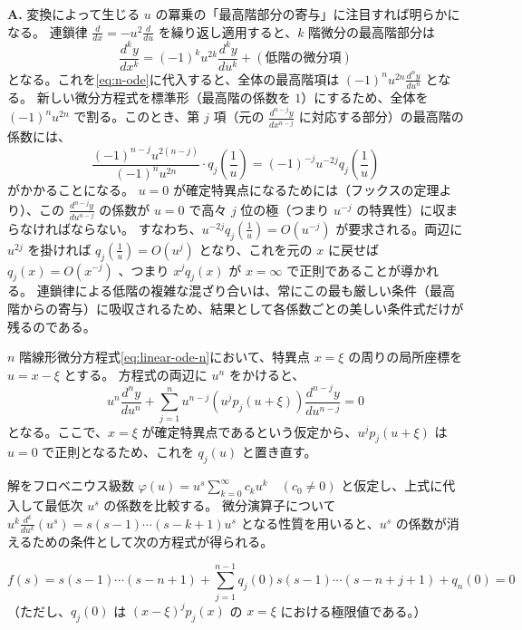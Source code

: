 \begin{Q}[【核心】$x=\frac{1}{u}$ と変換したとき、連鎖律によって微分方程式は低階の項が複雑に混ざり合った形になるはずである。それにもかかわらず、なぜ $x^{j}q_{j}(x)$ が正則という、各項が独立したシンプルな条件に帰着するのか？]
\textbf{A.} 変換によって生じる $u$ の冪乗の「最高階部分の寄与」に注目すれば明らかになる。
連鎖律 $\frac{d}{dx} = -u^{2}\frac{d}{du}$ を繰り返し適用すると、$k$ 階微分の最高階部分は
\[
\frac{d^{k}y}{dx^{k}} = (-1)^{k} u^{2k} \frac{d^{k}y}{du^{k}} + (\text{低階の微分項})
\]
となる。これを\eqref{eq:n-ode}に代入すると、全体の最高階項は $(-1)^{n} u^{2n} \frac{d^{n}y}{du^{n}}$ となる。
新しい微分方程式を標準形（最高階の係数を $1$）にするため、全体を $(-1)^{n} u^{2n}$ で割る。このとき、第 $j$ 項（元の $\frac{d^{n-j}y}{dx^{n-j}}$ に対応する部分）の最高階の係数には、
\[
\frac{(-1)^{n-j} u^{2(n-j)}}{(-1)^{n} u^{2n}} \cdot q_{j}\left(\frac{1}{u}\right) = (-1)^{-j} u^{-2j} q_{j}\left(\frac{1}{u}\right)
\]
がかかることになる。
$u=0$ が確定特異点になるためには（フックスの定理より）、この $\frac{d^{n-j}y}{du^{n-j}}$ の係数が $u=0$ で高々 $j$ 位の極（つまり $u^{-j}$ の特異性）に収まらなければならない。
すなわち、$u^{-2j} q_{j}(\frac{1}{u}) = O(u^{-j})$ が要求される。両辺に $u^{2j}$ を掛ければ $q_{j}(\frac{1}{u}) = O(u^{j})$ となり、これを元の $x$ に戻せば $q_{j}(x) = O(x^{-j})$ 、つまり $x^{j}q_{j}(x)$ が $x=\infty$ で正則であることが導かれる。
連鎖律による低階の複雑な混ざり合いは、常にこの最も厳しい条件（最高階からの寄与）に吸収されるため、結果として各係数ごとの美しい条件式だけが残るのである。
\end{Q}
$n$ 階線形微分方程式\eqref{eq:linear-ode-n}において、特異点 $x=\xi$ の周りの局所座標を $u = x-\xi$ とする。
方程式の両辺に $u^{n}$ をかけると、
\[
u^{n}\frac{d^{n}y}{du^{n}} + \sum_{j=1}^{n} u^{n-j} \left( u^{j}p_{j}(u+\xi) \right) \frac{d^{n-j}y}{du^{n-j}} = 0
\]
となる。ここで、$x=\xi$ が確定特異点であるという仮定から、$u^{j}p_{j}(u+\xi)$ は $u=0$ で正則となるため、これを $q_{j}(u)$ と置き直す。

解をフロベニウス級数 $\varphi(u) = u^{s} \sum_{k=0}^{\infty} c_{k} u^{k} \quad (c_{0} \neq 0)$ と仮定し、上式に代入して最低次 $u^{s}$ の係数を比較する。
微分演算子について $u^{k} \frac{d^{k}}{du^{k}} (u^{s}) = s(s-1)\cdots(s-k+1)u^{s}$ となる性質を用いると、$u^{s}$ の係数が消えるための条件として次の方程式が得られる。

\begin{equation}\label{eq:indicial-n}
f(s) = s(s-1)\cdots(s-n+1) + \sum_{j=1}^{n-1} q_{j}(0) s(s-1)\cdots(s-n+j+1) + q_{n}(0) = 0
\end{equation}
（ただし、$q_{j}(0)$ は $(x-\xi)^{j}p_{j}(x)$ の $x=\xi$ における極限値である。）

